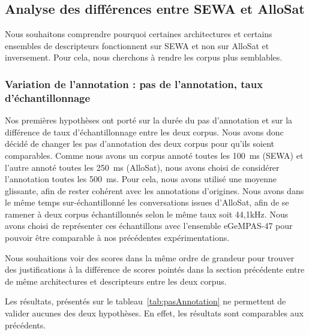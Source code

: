 \subsection{Analyse des différences entre SEWA et AlloSat}
Nous souhaitons comprendre pourquoi certaines architectures et certains ensembles de descripteurs fonctionnent sur SEWA et non sur AlloSat et inversement. Pour cela, nous cherchons à rendre les corpus plus semblables.

\subsubsection{Variation de l'annotation : pas de l'annotation, taux d'échantillonnage}
Nos premières hypothèses ont porté sur la durée du pas d'annotation et sur la différence de taux d'échantillonnage entre les deux corpus. Nous avons donc décidé de changer les pas d'annotation des deux corpus pour qu'ils soient comparables. Comme nous avons un corpus annoté toutes les 100~ms (SEWA) et l'autre annoté toutes les 250~ms (AlloSat), nous avons choisi de considérer l'annotation toutes les 500~ms. Pour cela, nous avons utilisé une moyenne glissante, afin de rester cohérent avec les annotations d'origines. Nous avons dans le même temps sur-échantillonné les conversations issues d'AlloSat, afin de se ramener à deux corpus échantillonnés selon le même taux soit 44,1kHz. Nous avons choisi de représenter ces échantillons avec l'ensemble eGeMPAS-47 pour pouvoir être comparable à nos précédentes expérimentations.

Nous souhaitions voir des scores dans la même ordre de grandeur pour trouver des justifications à la différence de scores pointés dans la section précédente entre de même architectures et descripteurs entre les deux corpus.



Les résultats, présentés sur le tableau~\ref{tab:pasAnnotation} ne permettent de valider aucunes des deux hypothèses. En effet, les résultats sont comparables aux précédents.

